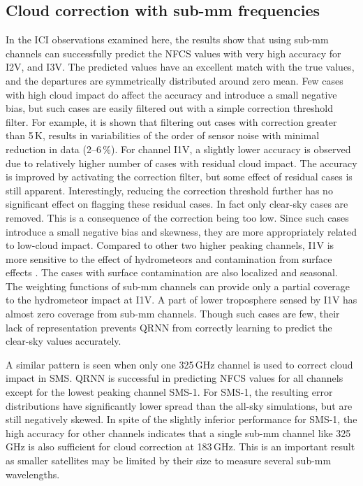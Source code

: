 \documentclass[amt, manuscript]{copernicus}
\begin{document}
\subsection{Cloud correction with sub-mm frequencies }
%
In the ICI observations examined here, the results show that using sub-mm channels can successfully predict the NFCS values with very high accuracy for I2V, and I3V. The predicted values have an excellent match with the true values, and the departures are symmetrically distributed around zero mean. Few cases with high cloud impact do affect the accuracy and introduce a small negative bias, but such cases are easily filtered out with a simple correction threshold filter. For example, it is shown that filtering out cases with correction greater than 5\,K, results in variabilities of the order of sensor noise with minimal reduction in data (2--6\,\%). For channel I1V, a slightly lower accuracy is observed due to relatively higher number of cases with residual cloud impact. The accuracy is improved by activating the correction filter, but some effect of residual cases is still apparent. Interestingly, reducing the correction threshold further has no significant effect on flagging these residual cases. In fact only clear-sky cases are removed. This is a consequence of the correction being too low. Since such cases introduce a small negative bias and skewness, they are more appropriately related to low-cloud impact. Compared to other two higher peaking channels, I1V is more sensitive to the effect of hydrometeors  and contamination from surface effects \citep[Fig. 4 of][]{eriksson:towar:20}. The cases with surface contamination are also localized and seasonal. The weighting functions of sub-mm channels can provide only a partial coverage to the hydrometeor impact at I1V. A part of lower troposphere sensed by I1V has almost zero coverage from sub-mm channels. Though such cases are few, their lack of representation prevents QRNN from correctly learning to predict the clear-sky values accurately.

A similar pattern is seen when only one 325\,GHz channel is used to correct cloud impact in SMS. QRNN is successful in predicting NFCS values for all channels except for the lowest peaking channel SMS-1. For SMS-1, the resulting error distributions have significantly lower spread than the all-sky simulations, but are still negatively skewed. In spite of the slightly inferior performance for SMS-1, the high accuracy for other channels indicates that a single sub-mm channel like 325\,GHz is also sufficient for cloud correction at 183\,GHz. This is an important result as smaller satellites may be limited by their size to measure several sub-mm wavelengths.
\end{document}
